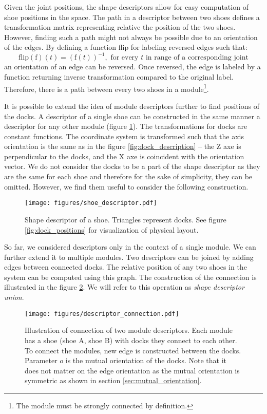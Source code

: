 Given the joint positions, the shape descriptors allow for easy computation of
shoe positions in the space. The path in a descriptor between two shoes defines
a transformation matrix representing relative the position of the two shoes.
However, finding such a path might not always be possible due to an orientation
of the edges. By defining a function flip for labeling reversed edges such that:
\[\text{flip}(\text{f})(t) = (\text{f}(t))^{-1}, \text{ for every } t \text{ in
range of a corresponding joint}\] an orientation of an edge can be reversed.
Once reversed, the edge is labeled by a function returning inverse
transformation compared to the original label. Therefore, there is a path
between every two shoes in a module\footnote{The module must be strongly
connected by definition.}.

It is possible to extend the idea of module descriptors further to find
positions of the docks. A descriptor of a single shoe can be constructed in the
same manner a descriptor for any other module (figure
\ref{fig:shoe_descriptor}). The transformations for docks are constant
functions. The coordinate system is transformed such that the axis orientation
is the same as in the figure \ref{fig:dock_description} -- the Z axe is
perpendicular to the docks, and the X axe is coincident with the orientation
vector. We do not consider the docks to be a part of the shape descriptor as
they are the same for each shoe and therefore for the sake of simplicity, they
can be omitted. However, we find them useful to consider the following
construction.

\begin{figure}[t]
    \centering
    \texttt{[image: figures/shoe\_descriptor.pdf]}
    \caption{Shape descriptor of a shoe. Triangles represent docks. See figure
    \ref{fig:dock_positions} for visualization of physical layout.}
    \label{fig:shoe_descriptor}
\end{figure}

So far, we considered descriptors only in the context of a single module. We can
further extend it to multiple modules. Two descriptors can be joined by adding
edges between connected docks. The relative position of any two shoes in the
system can be computed using this graph. The construction of the connection is
illustrated in the figure \ref{fig:connection_descriptor}. We will refer to this
operation as \emph{shape descriptor union}.

\begin{figure}[t]
    \centering
    \texttt{[image: figures/descriptor\_connection.pdf]}
    \caption{Illustration of connection of two module descriptors. Each module
    has a shoe (shoe A, shoe B) with docks they connect to each other. To
    connect the modules, new edge is constructed between the docks. Parameter
    $o$ is the mutual orientation of the docks. Note that it does not matter on
    the edge orientation as the mutual orientation is symmetric as shown in
    section \ref{sec:mutual_orientation}. }
    \label{fig:connection_descriptor}
\end{figure}

